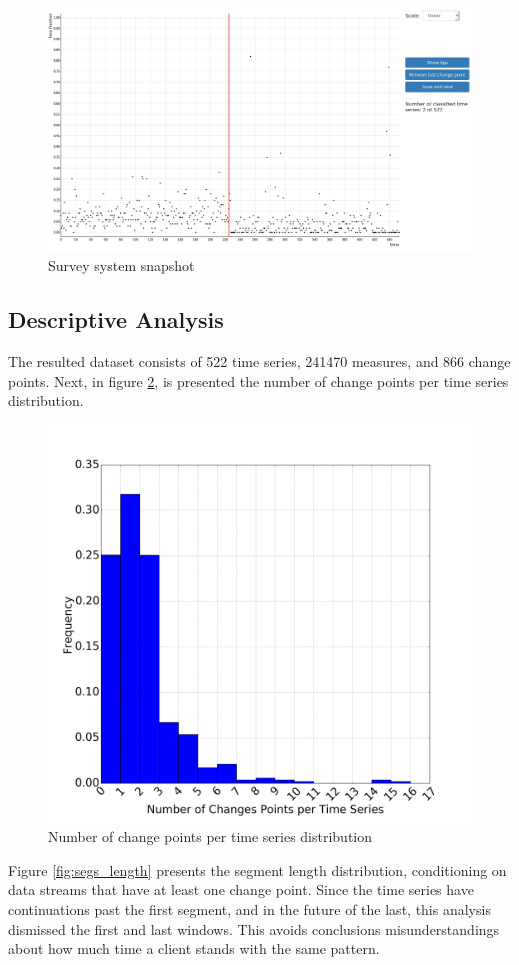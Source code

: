 \begin{figure}[H]
    \centering
    \includegraphics[width=\linewidth]{./figures/dataset/cp/survey_system.png}
    \caption{Survey system snapshot}
    \label{fig:survey_system}
\end{figure}%

\subsection{Descriptive Analysis}

The resulted dataset consists of 522 time series, 241470 measures, and 866 change points. Next, in figure \ref{fig:cps_per_ts}, is presented the number of change points per time series distribution.

\begin{figure}[H]
    \centering
    \includegraphics[width=0.6\linewidth]{./figures/dataset/cp/cps_per_ts.png}
    \caption{Number of change points per time series distribution}
    \label{fig:cps_per_ts}
\end{figure}%

Figure \ref{fig:segs_length} presents the segment length distribution, conditioning on data streams that have at least one change point. Since the time series have continuations past the first segment, and in the future of the last, this analysis dismissed the first and last windows. This avoids conclusions misunderstandings about how much time a client stands with the same pattern.

